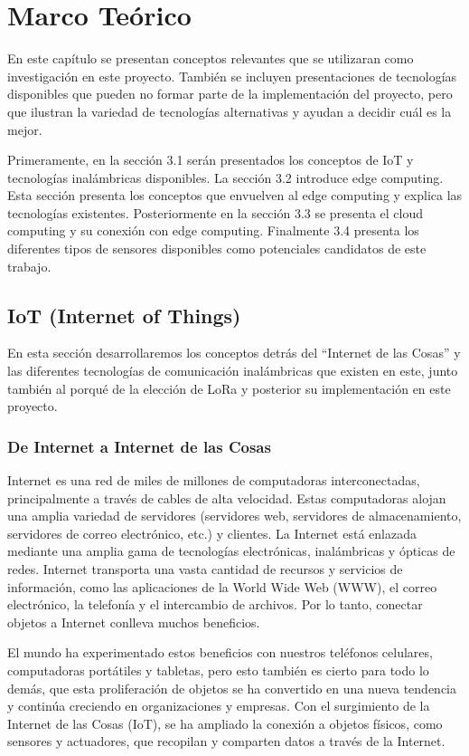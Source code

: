 \newpage
\section{Marco Teórico}
En este capítulo se presentan conceptos relevantes que se utilizaran como investigación en este proyecto. También se incluyen presentaciones de tecnologías disponibles que pueden no formar parte de la implementación del proyecto, pero que ilustran la variedad de tecnologías alternativas y ayudan a decidir cuál es la mejor.

Primeramente, en la sección 3.1 serán presentados los conceptos de IoT y tecnologías inalámbricas disponibles. La sección 3.2 introduce edge computing. Esta sección presenta los conceptos que envuelven al edge computing y explica las tecnologías existentes. Posteriormente en la sección 3.3 se presenta el cloud computing y su conexión con edge computing. Finalmente 3.4 presenta los diferentes tipos de sensores disponibles como potenciales candidatos de este trabajo.

\subsection{IoT (Internet of Things)}
En esta sección desarrollaremos los conceptos detrás del “Internet de las Cosas” y las diferentes tecnologías de comunicación inalámbricas que existen en este, junto también al porqué de la elección de LoRa y posterior su implementación en este proyecto.

\subsubsection{De Internet a Internet de las Cosas}
Internet es una red de miles de millones de computadoras interconectadas, principalmente a través de cables de alta velocidad. Estas computadoras alojan una amplia variedad de servidores (servidores web, servidores de almacenamiento, servidores de correo electrónico, etc.) y clientes. La Internet está enlazada mediante una amplia gama de tecnologías electrónicas, inalámbricas y ópticas de redes. Internet transporta una vasta cantidad de recursos y servicios de información, como las aplicaciones de la World Wide Web (WWW), el correo electrónico, la telefonía y el intercambio de archivos. Por lo tanto, conectar objetos a Internet conlleva muchos beneficios.

El mundo ha experimentado estos beneficios con nuestros teléfonos celulares, computadoras portátiles y tabletas, pero esto también es cierto para todo lo demás, que esta proliferación de objetos se ha convertido en una nueva tendencia y continúa creciendo en organizaciones y empresas. Con el surgimiento de la Internet de las Cosas (IoT), se ha ampliado la conexión a objetos físicos, como sensores y actuadores, que recopilan y comparten datos a través de la Internet.

